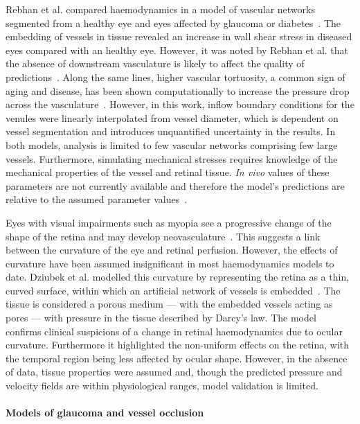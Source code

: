 \documentclass{article}
\begin{document}
Rebhan et al. compared haemodynamics in a model of vascular networks segmented from a healthy eye and eyes affected by glaucoma or diabetes~\cite{Rebhan_2019}.
The embedding of vessels in tissue revealed an increase in wall shear stress in diseased eyes compared with an healthy eye.
However, it was noted by Rebhan et al. that the absence of downstream vasculature is likely to affect the quality of predictions~\cite{Rebhan_2019}.
Along the same lines, higher vascular tortuosity, a common sign of aging and disease, has been shown computationally to increase the pressure drop across the vasculature~\cite{Malek_2014}.
However, in this work, inflow boundary conditions for the venules were linearly interpolated from vessel diameter, which is dependent on vessel segmentation and introduces unquantified uncertainty in the results.
In both models, analysis is limited to few vascular networks comprising few large vessels.
Furthermore, simulating mechanical stresses requires knowledge of the mechanical properties of the vessel and retinal tissue.
\textit{In vivo} values of these parameters are not currently available and therefore the model's predictions are relative to the assumed parameter values~\cite{Rebhan_2019}.

Eyes with visual impairments such as myopia see a progressive change of the shape of the retina and may develop neovasculature~\cite{Medina_2016}.
This suggests a link between the curvature of the eye and retinal perfusion.
However, the effects of curvature have been assumed insignificant in most haemodynamics models to date.
Dziubek et al. modelled this curvature by representing the retina as a thin, curved surface, within which an artificial network of vessels is embedded~\cite{Dziubek_2015}.
The tissue is considered a porous medium --- with the embedded vessels acting as pores --- with pressure in the tissue described by Darcy's law.
The model confirms clinical suspicions of a change in retinal haemodynamics due to ocular curvature.
Furthermore it highlighted the non-uniform effects on the retina, with the temporal region being less affected by ocular shape\cite{Dziubek_2015}.
However, in the absence of data, tissue properties were assumed and, though the predicted pressure and velocity fields are within physiological ranges, model validation is limited.

\paragraph*{Models of glaucoma and vessel occlusion}
\end{document}
